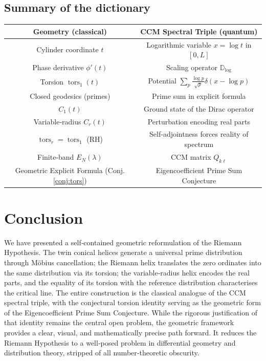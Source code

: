 \documentclass[12pt,a4paper]{article}
\newcommand{\tors}{\operatorname{tors}}
\begin{document}
\subsection{Summary of the dictionary}
\begin{center}
\begin{tabular}{c|c}
\textbf{Geometry (classical)} & \textbf{CCM Spectral Triple (quantum)} \\
\hline
Cylinder coordinate $t$ & Logarithmic variable $x = \log t$ in $[0,L]$ \\
Phase derivative $\phi'(t)$ & Scaling operator $\mathbb{D}_{\log}$ \\
Torsion $\tors_1(t)$ & Potential $\sum_{p} \frac{\log p}{\sqrt{p}} \delta(x-\log p)$ \\
Closed geodesics (primes) & Prime sum in explicit formula \\
$C_1(t)$ & Ground state of the Dirac operator \\
Variable‑radius $C_r(t)$ & Perturbation encoding real parts \\
$\tors_r = \tors_1$ (RH) & Self‑adjointness forces reality of spectrum \\
Finite‑band $E_N(\lambda)$ & CCM matrix $Q_{k\ell}$ \\
Geometric Explicit Formula (Conj.\ref{conj:tors}) & Eigencoefficient Prime Sum Conjecture
\end{tabular}
\end{center}

\section{Conclusion}

We have presented a self‑contained geometric reformulation of the Riemann Hypothesis.  The twin conical helices generate a universal prime distribution through M\"obius cancellation; the Riemann helix translates the zero ordinates into the same distribution via its torsion; the variable‑radius helix encodes the real parts, and the equality of its torsion with the reference distribution characterises the critical line.  The entire construction is the classical analogue of the CCM spectral triple, with the conjectural torsion identity serving as the geometric form of the Eigencoefficient Prime Sum Conjecture.  While the rigorous justification of that identity remains the central open problem, the geometric framework provides a clear, visual, and mathematically precise path forward.  It reduces the Riemann Hypothesis to a well‑posed problem in differential geometry and distribution theory, stripped of all number‑theoretic obscurity.
\end{document}
